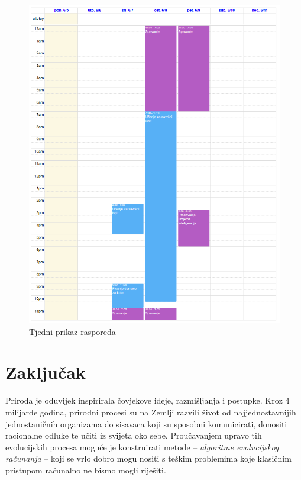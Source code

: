 \documentclass[times, utf8, zavrsni]{fer}
\begin{document}
\begin{figure}[]
\centering
\includegraphics[width=\textwidth]{resources/graphics/screenshot-raspored-1.png}
\caption{Tjedni prikaz rasporeda}
\label{img:weekly_calendar}
\end{figure}

\chapter{Zaključak}
Priroda je oduvijek inspirirala čovjekove ideje, razmišljanja i postupke. Kroz 4 milijarde godina, prirodni procesi su na Zemlji razvili život od najjednostavnijih jednostaničnih organizama do sisavaca koji su sposobni komunicirati, donositi racionalne odluke te učiti iz svijeta oko sebe. Proučavanjem upravo tih evolucijskih procesa moguće je konstruirati metode -- \textit{algoritme evolucijskog računanja} -- koji se vrlo dobro mogu nositi s teškim problemima koje klasičnim pristupom računalno ne bismo mogli riješiti.
\end{document}
